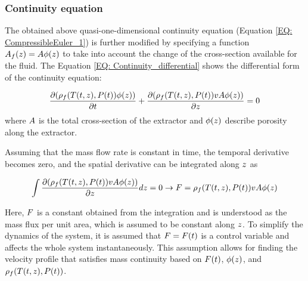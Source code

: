 \documentclass[../Article_Model_Parameters.tex]{subfiles}
\begin{document}
		
	\subsubsection{Continuity equation} \label{CH: Continuity}
	The obtained above quasi-one-dimensional continuity equation (Equation \ref{EQ: CompressibleEuler_1}) is further modified by specifying a function ${\color{black}A_f}(z) = {\color{black}A\phi}(z)$ to take into account the change of the cross-section available for the fluid. The Equation \ref{EQ: Continuity_differential} shows the differential form of the continuity equation: 
	
	{\footnotesize
		\begin{equation} \label{EQ: Continuity_differential}
			\frac{\partial ({\color{black}\rho_f}({\color{black}T}(t,z),{\color{black}P}(t)) {\color{black}\phi}(z))}{\partial t} + \frac{\partial ({\color{black}\rho_f}({\color{black}T}(t,z),{\color{black}P}(t)) v {\color{black}A\phi}(z))}{\partial {\color{black}z}} = 0
		\end{equation}
	}
	where ${\color{black} A}$ is the total cross-section of the extractor and ${\color{black}\phi}(z)$ describe porosity along the extractor.
	
	
	Assuming that the mass flow rate is constant in time, the temporal derivative becomes zero, and the spatial derivative can be integrated along ${\color{black}z}$ as
	
	{\footnotesize
		\begin{equation}
			\int \frac{\partial ({\color{black}\rho_f}({\color{black}T}(t,z),{\color{black}P}(t)) v {\color{black}A \phi}(z) )}{\partial {\color{black}z}} dz = 0 \rightarrow {\color{black}F}={\color{black}\rho_f}({\color{black}T}(t,z),{\color{black}P}(t)) v {\color{black}A\phi}(z)
		\end{equation}
	}
	
	Here, ${\color{black}F}$ is a constant obtained from the integration and is understood as the mass flux per unit area, which is assumed to be constant along ${\color{black}z}$. To simplify the dynamics of the system, it is assumed that ${\color{black}F}={\color{black}F}(t)$ is a control variable and affects the whole system instantaneously. This assumption allows for finding the velocity profile that satisfies mass continuity based on ${\color{black}F}(t)$, ${\color{black}\phi}(z)$, and ${\color{black}\rho_f}({\color{black}T}(t,z),{\color{black}P}(t))$.
	
\end{document}
